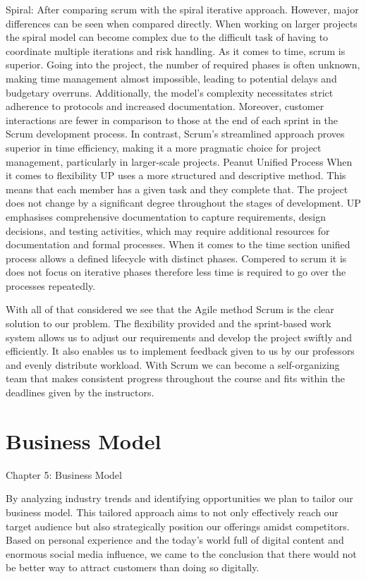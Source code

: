 \documentclass[12pt]{report}
\begin{document}
Spiral: 
After comparing scrum with the spiral iterative approach. However, major differences can be seen when compared directly.  When working on larger projects the spiral model can become complex due to the difficult task of having to coordinate multiple iterations and risk handling.  As it comes to time, scrum is superior. Going into the project, the number of required phases is often unknown, making time management almost impossible, leading to potential delays and budgetary overruns. Additionally, the model's complexity necessitates strict adherence to protocols and increased documentation. Moreover, customer interactions are fewer in comparison to those at the end of each sprint in the Scrum development process. In contrast, Scrum's streamlined approach proves superior in time efficiency, making it a more pragmatic choice for project management, particularly in larger-scale projects.
Peanut
Unified Process
When it comes to flexibility UP uses a more structured and descriptive method. This means that each member has a given task and they complete that. The project does not change by a significant degree throughout the stages of development. UP emphasises comprehensive documentation to capture requirements, design decisions, and testing activities, which may require additional resources for documentation and formal processes.
When it comes to the time section unified process allows a defined lifecycle with distinct phases. Compered to scrum it is does not focus on iterative phases therefore less time is required to go over the processes repeatedly.

With all of that considered we see that the Agile method Scrum is the clear solution to our problem. The flexibility provided and the sprint-based work system allows us to adjust our requirements and develop the project swiftly and efficiently. It also enables us to implement feedback given to us by our professors and evenly distribute workload. With Scrum we can become a self-organizing team that makes consistent progress throughout the course and fits within the deadlines given by the instructors. 


\section{Business Model}
Chapter 5: Business Model 

By analyzing industry trends and identifying opportunities we plan to tailor our business model. This tailored approach aims to not only effectively reach our target audience but also strategically position our offerings amidst competitors. Based on personal experience and the today’s world full of digital content and enormous social media influence, we came to the conclusion that there would not be better way to attract customers than doing so digitally.
\end{document}
